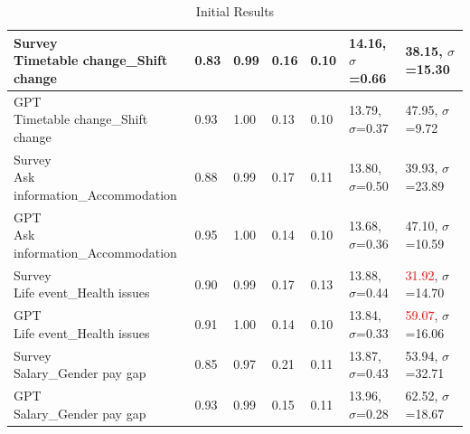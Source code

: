 \begin{table}[h]
{\begin{tabular}{|l|l|l|l|l|l|l|}
    \shortstack[l]{Survey\\Timetable change\_Shift change}                            & 0.83                          & 0.99                         & 0.16                              & 0.10                              & 14.16, $\sigma$=0.66              & 38.15, $\sigma$=15.30    \\ \hline
    \shortstack[l]{GPT\\Timetable change\_Shift change}                               & 0.93                          & 1.00                         & 0.13                              & 0.10                              & 13.79, $\sigma$=0.37              & 47.95, $\sigma$=9.72     \\ \hline
    \shortstack[l]{Survey\\Ask information\_Accommodation}                            & 0.88                          & 0.99                         & 0.17                              & 0.11                              & 13.80, $\sigma$=0.50              & 39.93, $\sigma$=23.89    \\ \hline
    \shortstack[l]{GPT\\Ask information\_Accommodation}                               & 0.95                          & 1.00                         & 0.14                              & 0.10                              & 13.68, $\sigma$=0.36              & 47.10, $\sigma$=10.59    \\ \hline
    \shortstack[l]{Survey\\Life event\_Health issues}                                 & 0.90                          & 0.99                         & 0.17                              & 0.13                              & 13.88, $\sigma$=0.44              & \textcolor{red}{31.92}, $\sigma$=14.70    \\ \hline
    \shortstack[l]{GPT\\Life event\_Health issues}                                    & 0.91                          & 1.00                         & 0.14                              & 0.10                              & 13.84, $\sigma$=0.33              & \textcolor{red}{59.07}, $\sigma$=16.06    \\ \hline
    \shortstack[l]{Survey\\Salary\_Gender pay gap}                                    & 0.85                          & 0.97                         & 0.21                              & 0.11                              & 13.87, $\sigma$=0.43              & 53.94, $\sigma$=32.71    \\ \hline
    \shortstack[l]{GPT\\Salary\_Gender pay gap}                                       & 0.93                          & 0.99                         & 0.15                              & 0.11                              & 13.96, $\sigma$=0.28              & 62.52, $\sigma$=18.67    \\ \hline
    \end{tabular}}
    \caption{Initial Results}\label{table:initial_results}
\end{table}



